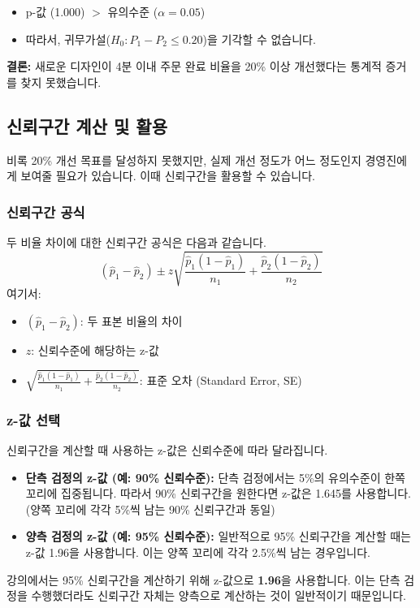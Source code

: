 \documentclass[11pt,a4paper]{book}
\theoremstyle{definition}
\begin{document}
\begin{summarybox}[title=p-값 해석:]
\begin{itemize}
    \item p-값 (1.000) $>$ 유의수준 ($\alpha=0.05$)
    \item 따라서, 귀무가설($H_0: P_1 - P_2 \le 0.20$)을 기각할 수 없습니다.
\end{itemize}
\textbf{결론:} 새로운 디자인이 4분 이내 주문 완료 비율을 20\% 이상 개선했다는 통계적 증거를 찾지 못했습니다.
\end{summarybox}

\subsection{신뢰구간 계산 및 활용}

비록 20\% 개선 목표를 달성하지 못했지만, 실제 개선 정도가 어느 정도인지 경영진에게 보여줄 필요가 있습니다. 이때 신뢰구간을 활용할 수 있습니다.

\subsubsection{신뢰구간 공식}
두 비율 차이에 대한 신뢰구간 공식은 다음과 같습니다.
$$ (\hat{p}_1 - \hat{p}_2) \pm z \sqrt{\frac{\hat{p}_1(1-\hat{p}_1)}{n_1} + \frac{\hat{p}_2(1-\hat{p}_2)}{n_2}} $$
여기서:
\begin{itemize}
    \item $(\hat{p}_1 - \hat{p}_2)$: 두 표본 비율의 차이
    \item $z$: 신뢰수준에 해당하는 z-값
    \item $\sqrt{\frac{\hat{p}_1(1-\hat{p}_1)}{n_1} + \frac{\hat{p}_2(1-\hat{p}_2)}{n_2}}$: 표준 오차 (Standard Error, SE)
\end{itemize}

\subsubsection{z-값 선택}
신뢰구간을 계산할 때 사용하는 z-값은 신뢰수준에 따라 달라집니다.
\begin{itemize}
    \item \textbf{단측 검정의 z-값 (예: 90\% 신뢰수준):} 단측 검정에서는 5\%의 유의수준이 한쪽 꼬리에 집중됩니다. 따라서 90\% 신뢰구간을 원한다면 z-값은 1.645를 사용합니다. (양쪽 꼬리에 각각 5\%씩 남는 90\% 신뢰구간과 동일)
    \item \textbf{양측 검정의 z-값 (예: 95\% 신뢰수준):} 일반적으로 95\% 신뢰구간을 계산할 때는 z-값 1.96을 사용합니다. 이는 양쪽 꼬리에 각각 2.5\%씩 남는 경우입니다.
\end{itemize}
강의에서는 95\% 신뢰구간을 계산하기 위해 z-값으로 \textbf{1.96}을 사용합니다. 이는 단측 검정을 수행했더라도 신뢰구간 자체는 양측으로 계산하는 것이 일반적이기 때문입니다.
\end{document}
